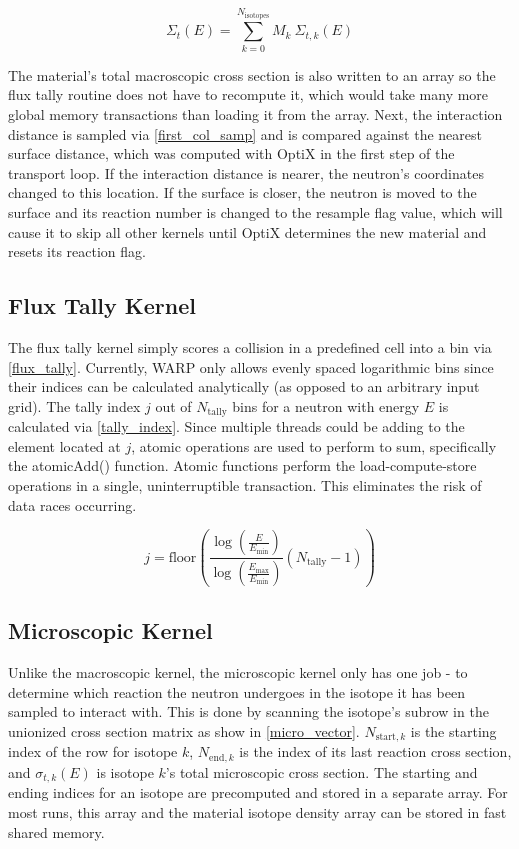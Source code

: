 \begin{equation}
\Sigma_t(E) = \sum_{k=0}^{N_\mathrm{isotopes}} M_k \: \Sigma_{t,k}(E)
\label{macro_vector}
\end{equation}

The material's total macroscopic cross section is also written to an array so the flux tally routine does not have to recompute it, which would take many more global memory transactions than loading it from the array.  Next, the interaction distance is sampled via \eqref{first_col_samp} and is compared against the nearest surface distance, which was computed with OptiX in the first step of the transport loop.  If the interaction distance is nearer, the neutron's coordinates changed to this location.  If the surface is closer, the neutron is moved to the surface and its reaction number is changed to the resample flag value, which will cause it to skip all other kernels until OptiX determines the new material and resets its reaction flag.

\subsection{Flux Tally Kernel}

The flux tally kernel simply scores a collision in a predefined cell into a bin via \eqref{flux_tally}.  Currently, WARP only allows evenly spaced logarithmic bins since their indices can be calculated analytically (as opposed to an arbitrary input grid).  The tally index $j$ out of $N_\mathrm{tally}$ bins for a neutron with energy $E$ is calculated via \eqref{tally_index}.  Since multiple threads could be adding to the element located at $j$, atomic operations are used to perform to sum, specifically the atomicAdd() function.  Atomic functions perform the load-compute-store operations in a single, uninterruptible transaction.  This eliminates the risk of data races occurring.

\begin{equation}
j = \mathrm{floor} \left( \frac{ \log \left( \frac{E}{E_\mathrm{min}} \right)} { \log \left( \frac{E_\mathrm{max}}{E_\mathrm{min}} \right)} (N_\mathrm{tally}-1) \right)
\label{tally_index}
\end{equation}

\subsection{Microscopic Kernel}

Unlike the macroscopic kernel, the microscopic kernel only has one job - to determine which reaction the neutron undergoes in the isotope it has been sampled to interact with.  This is done by scanning the isotope's subrow in the unionized cross section matrix as show in \eqref{micro_vector}.  $N_{\mathrm{start},k}$ is the starting index of the row for isotope $k$, $N_{\mathrm{end},k}$ is the index of its last reaction cross section, and $\sigma_{t,k}(E)$ is isotope $k$'s total microscopic cross section.  The starting and ending indices for an isotope are precomputed and stored in a separate array.  For most runs, this array and the material isotope density array can be stored in fast shared memory.

